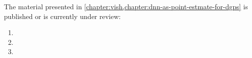 The material presented in \cref{chapter:vish,chapter:dnn-as-point-estmate-for-dgps} is published or is currently under review:
\begin{enumerate}
    \item {}
    \item {}
    \item {}
\end{enumerate}





